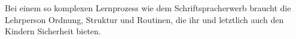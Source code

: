 Bei einem so komplexen Lernprozess wie dem Schriftspracherwerb braucht die Lehrperson Ordnung, Struktur und Routinen, die ihr und letztlich auch den Kindern Sicherheit bieten.